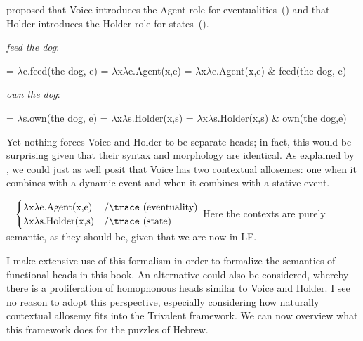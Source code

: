 \begin{exe}
\begin{xlist}
\begin{exe}
\begin{exe}
\begin{exe}
\begin{exe}
\begin{xlist}
\begin{exe}
\begin{xlist}
\begin{xlist}
\begin{xlist}
\begin{exe}
\begin{xlist}
\begin{exe}
\begin{exe}
\begin{exe}
\begin{exe}
\begin{xlist}
\begin{exe}
\begin{xlist}
\begin{exe}
\begin{exe}
\begin{xlist}
\begin{exe}
\begin{xlist}
\begin{exe}
\begin{xlist}
\begin{exe}
\begin{exe}
\begin{xlist}
\begin{exe}
\begin{exe}
\begin{xlist}
\begin{exe}
\begin{exe}
\begin{xlist}
\begin{exe}
\cite{kratzer96} proposed that Voice introduces the Agent role for eventualities~(\nextx) and that Holder introduces the Holder role for states~(\anextx).
 \begin{exe}
 \ex  \emph{feed the dog}: 
 \begin{xlist} 
 	\ex  {} = $\lambda$e.feed(the dog, e) 
 	\ex  {} = $\lambda$x$\lambda$e.Agent(x,e) 
 	\ex  {} = $\lambda$x$\lambda$e.Agent(x,e) \& feed(the dog, e) 
 \z
\z 
 \begin{exe}
 \ex  \emph{own the dog}: 
 \begin{xlist} 
 	\ex  {} = $\lambda$s.own(the dog, e) 
 	\ex  {} = $\lambda$x$\lambda$s.Holder(x,s) 
 	\ex  {} = $\lambda$x$\lambda$s.Holder(x,s) \& own(the dog,e) 
 \z
\z 

Yet nothing forces Voice and Holder to be separate heads; in fact, this would be surprising given that their syntax and morphology are identical. As explained by \cite{wood15springer}, we could just as well posit that Voice has two contextual allosemes: one when it combines with a dynamic event and when it combines with a stative event.
 \begin{exe}
\ex  {} \lra~ $\begin{cases} 
	\lambda\text{x}\lambda\text{e.Agent(x,e)} & / \trace~ \text{(eventuality)} \\
	\lambda\text{x}\lambda\text{s.Holder(x,s)} & / \trace~ \text{(state)} \\
	\end{cases}$ 
 \z 
Here the contexts are purely semantic, as they should be, given that we are now in LF.

I make extensive use of this formalism in order to formalize the semantics of functional heads in this book. An alternative could also be considered, whereby there is a proliferation of homophonous heads similar to Voice and Holder. I see no reason to adopt this perspective, especially considering how naturally contextual allosemy fits into the Trivalent framework. We can now overview what this framework does for the puzzles of Hebrew.



\end{exe}
\end{xlist}
\end{exe}
\end{xlist}
\end{exe}
\end{exe}
\end{xlist}
\end{exe}
\end{exe}
\end{xlist}
\end{exe}
\end{exe}
\end{xlist}
\end{exe}
\end{exe}
\end{xlist}
\end{exe}
\end{xlist}
\end{exe}
\end{xlist}
\end{exe}
\end{exe}
\end{xlist}
\end{exe}
\end{xlist}
\end{exe}
\end{exe}
\end{exe}
\end{exe}
\end{xlist}
\end{exe}
\end{xlist}
\end{xlist}
\end{xlist}
\end{exe}
\end{xlist}
\end{exe}
\end{exe}
\end{exe}
\end{exe}
\end{xlist}
\end{exe}
